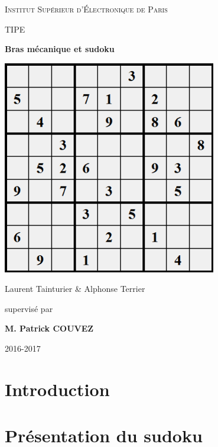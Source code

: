 \documentclass[12pt,a4paper]{report}
\newenvironment{changemargin}[2]{\begin{list}{}{%
\setlength{\topsep}{0pt}%
\setlength{\leftmargin}{0pt}%
\setlength{\rightmargin}{0pt}%
\setlength{\listparindent}{\parindent}%
\setlength{\itemindent}{\parindent}%
\setlength{\parsep}{0pt plus 1pt}%
\addtolength{\leftmargin}{#1}%
\addtolength{\rightmargin}{#2}%
}\item }{\end{list}}
\begin{document}
\FloatBarrier

\begin{titlepage}
\begin{changemargin}{-1cm}{0cm}
	\centering
	\vspace{5cm}
	{\scshape\huge Institut Supérieur d'Électronique de Paris \par}
	\vspace{1cm}
	{\scshape\LARGE TIPE\par}
	\vspace{1.5cm}
	{\fontsize{45}{45}\selectfont\bfseries Bras mécanique et sudoku\par}
	\vspace{2cm}
	\includegraphics[width=0.7\textwidth]{../pictures/pagedegarde.png}\par\vspace{1.5cm}
	{\LARGE Laurent Tainturier \& Alphonse Terrier\par}
	\vfill
	\large supervisé par\par
	\large \bfseries M. Patrick COUVEZ

	\vfill


	{\large 2016-2017}
\end{changemargin}
\end{titlepage}

\tableofcontents
{}
\chapter*{Introduction}
	

	\chapter{Présentation du sudoku}
	
\end{document}
